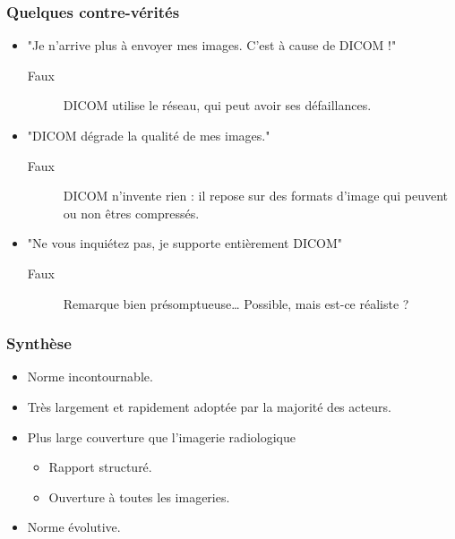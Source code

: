 \frame
{
	\frametitle{Quelques contre-v\'erit\'es}
	\begin{itemize}
		\item "Je n'arrive plus \`a envoyer mes images. C'est \`a cause de DICOM !"
		\begin{description}
			\item[Faux] DICOM utilise le r\'eseau, qui peut avoir ses d\'efaillances.
		\end{description}
		\item "DICOM d\'egrade la qualit\'e de mes images."
		\begin{description}
			\item[Faux] DICOM n'invente rien : il repose sur des formats d'image qui peuvent ou non \^etres compress\'es.
		\end{description}
		\item "Ne vous inqui\'etez pas, je supporte enti\`erement DICOM"
		\begin{description}
			\item[Faux] Remarque bien pr\'esomptueuse\ldots
			Possible, mais est-ce r\'ealiste ?
		\end{description}
	\end{itemize}
}

\frame
{
	\frametitle{Synth\`ese}
	\begin{itemize}
		\item Norme incontournable.
		\item Tr\`es largement et rapidement adopt\'ee par la majorit\'e des acteurs.
		\item Plus large couverture que l'imagerie radiologique
		\begin{itemize}
			\item Rapport structur\'e.
			\item Ouverture \`a toutes les imageries.
		\end{itemize}
		\item Norme \'evolutive.
	\end{itemize}
}

